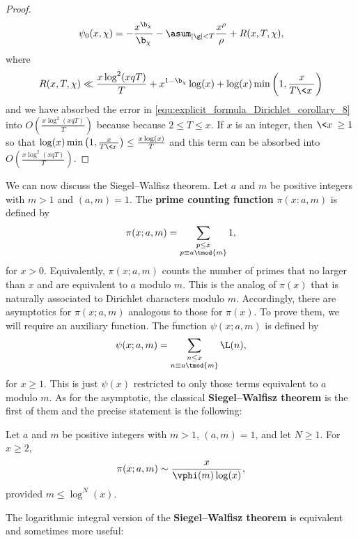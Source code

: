 \begin{proof}
      \begin{equation}\label{equ:explicit_formula_Dirichlet_corollary_10}
        \psi_{0}(x,\chi) = -\frac{x^{\b_{\chi}}}{\b_{\chi}}-\asum_{|\g| < T}\frac{x^{\rho}}{\rho}+R(x,T,\chi),
      \end{equation}
      where
      \[
        R(x,T,\chi) \ll \frac{x\log^{2}(xqT)}{T}+x^{1-\b_{\chi}}\log(x)+\log(x)\min\left(1,\frac{x}{T\<x\>}\right)
      \]
      and we have absorbed the error in \cref{equ:explicit_formula_Dirichlet_corollary_8} into $O\left(\frac{x\log^{2}(xqT)}{T}\right)$ because because $2 \le T \le x$. If $x$ is an integer, then $\<x\> \ge 1$ so that $\log(x)\min\left(1,\frac{x}{T\<x\>}\right) \le \frac{x\log(x)}{T}$ and this term can be absorbed into $O\left(\frac{x\log^{2}(xqT)}{T}\right)$.
    \end{proof}
    
    We can now discuss the Siegel–Walfisz theorem. Let $a$ and $m$ be positive integers with $m > 1$ and $(a,m) = 1$. The \textbf{prime counting function} $\pi(x:a,m)$ is defined by
    \[
      \pi(x;a,m) = \sum_{\substack{p \le x \\ p \equiv a \tmod{m}}}1,
    \]
    for $x > 0$. Equivalently, $\pi(x;a,m)$ counts the number of primes that no larger than $x$ and are equivalent to $a$ modulo $m$. This is the analog of $\pi(x)$ that is naturally associated to Dirichlet characters modulo $m$. Accordingly, there are asymptotics for $\pi(x;a,m)$ analogous to those for $\pi(x)$. To prove them, we will require an auxiliary function. The function $\psi(x;a,m)$ is defined by
    \[
      \psi(x;a,m) = \sum_{\substack{n \le x \\ n \equiv a \tmod{m}}}\L(n),
    \]
    for $x \ge 1$. This is just $\psi(x)$ restricted to only those terms equivalent to $a$ modulo $m$. As for the asymptotic, the classical \textbf{Siegel–Walfisz theorem} is the first of them and the precise statement is the following:

    \begin{theorem}
      Let $a$ and $m$ be positive integers with $m > 1$, $(a,m) = 1$, and let $N \ge 1$. For $x \ge 2$,
      \[
        \pi(x;a,m) \sim \frac{x}{\vphi(m)\log(x)},
      \]
      provided $m \le \log^{N}(x)$.
    \end{theorem}
    
    The logarithmic integral version of the \textbf{Siegel–Walfisz theorem} is equivalent and sometimes more useful:

